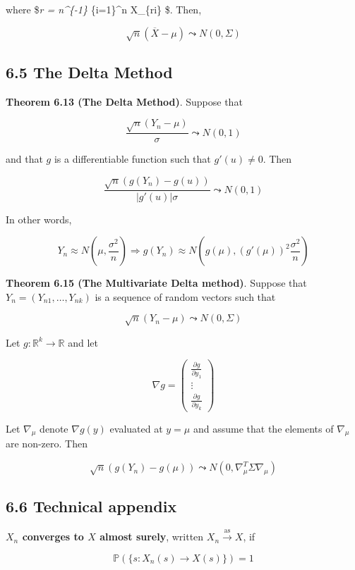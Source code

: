 where \$\emph{r = n\^{}\{-1\} \sum}\{i=1\}\^{}n X\_\{ri\}
\$. Then,

\[ \sqrt{n} (\overline{X} - \mu) \leadsto N(0, \Sigma) \]

\subsection{6.5 The Delta Method}\label{the-delta-method}

\textbf{Theorem 6.13 (The Delta Method)}. Suppose that

\[ \frac{\sqrt{n}(Y_n - \mu)}{\sigma} \leadsto N(0, 1)\]

and that \(g\) is a differentiable function such that \(g'(u) \neq 0\).
Then

\[ \frac{\sqrt{n}(g(Y_n) - g(u))}{|g'(u)| \sigma} \leadsto N(0, 1)\]

In other words,

\[ Y_n \approx N \left( \mu, \frac{\sigma^2}{n} \right) \Rightarrow g(Y_n) \approx N \left( g(\mu), (g'(\mu))^2 \frac{\sigma^2}{n} \right) \]

\textbf{Theorem 6.15 (The Multivariate Delta method)}. Suppose that
\(Y_n = (Y_{n1}, \dots, Y_{nk})\) is a sequence of random vectors such
that

\[ \sqrt{n}(Y_n - \mu) \leadsto N(0, \Sigma) \]

Let \(g : \mathbb{R}^k \rightarrow \mathbb{R}\) and let

\[ \nabla g = \begin{pmatrix} \frac{\partial g}{\partial y_1} \\ \vdots \\  \frac{\partial g}{\partial y_k} \end{pmatrix} \]

Let \(\nabla_\mu\) denote \(\nabla g(y)\) evaluated at \(y = \mu\) and
assume that the elements of \(\nabla_\mu\) are non-zero. Then

\[ \sqrt{n}(g(Y_n) - g(\mu)) \leadsto N(0, \nabla_\mu^T \Sigma \nabla_\mu) \]

\subsection{6.6 Technical appendix}\label{technical-appendix}

\textbf{\(X_n\) converges to \(X\) almost surely}, written
\(X_n \xrightarrow{\text{as}} X\), if

\[ \mathbb{P}(\{s : X_n(s) \rightarrow X(s)\}) = 1 \]

